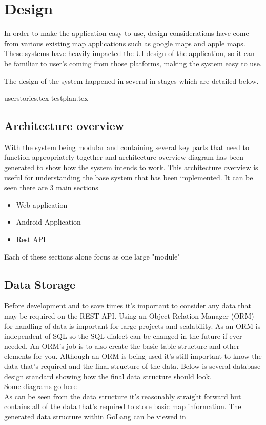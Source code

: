 \section{Design}
In order to make the application easy to use, design considerations have come from various existing map applications such as google maps and apple maps. These systems have heavily impacted the UI design of the application, so it can be familiar to user's coming from those platforms, making the system easy to use.

The design of the system happened in several in stages which are detailed below.

{userstories.tex}
{testplan.tex}

\subsection{Architecture overview}
With the system being modular and containing several key parts that need to function appropriately together and architecture overview diagram has been generated to show how the system intends to work. This architecture overview is useful for understanding the base system that has been implemented. It can be seen there are 3 main sections

\begin{itemize}
	\item Web application
	\item Android Application
	\item Rest API
\end{itemize}

Each of these sections alone focus as one large "module" 

\subsection{Data Storage}
Before development and to save times it's important to consider any data that may be required on the REST API. Using an Object Relation Manager (ORM) for handling of data is important for large projects and scalability. As an ORM is independent of SQL so the SQL dialect can be changed in the future if ever needed. An ORM's job is to also create the basic table structure and other elements for you. Although an ORM is being used it's still important to know the data that's required and the final structure of the data. Below is several database design standard showing how the final data structure should look.
\\
Some diagrams go here
\\
As can be seen from the data structure it's reasonably straight forward but contains all of the data that's required to store basic map information. The generated data structure within GoLang can be viewed in \appendixtemp

